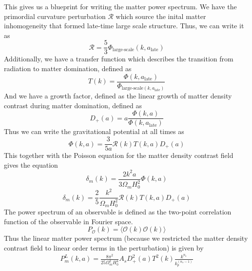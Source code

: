 This gives us a blueprint for writing the matter power spectrum. We have the primordial curvature perturbation $\mathcal{R}$ which source the inital matter inhomogeneity that formed late-time large scale structure. Thus, we can write it as
\begin{equation}
	\mathcal{R} = \frac{5}{3}\Phi_{\text{large-scale}}(k,a_{\text{late}})
\end{equation} 
Additionally, we have a transfer function which describes the transition from radiation to matter domination, defined as
\begin{equation}
	T(k) = \frac{\Phi(k,a_{\text{late}})}{\Phi_{\text{large-scale}(k,a_{\text{late}})}}
\end{equation}
And we have a growth factor, defined as the linear growth of matter density contrast during matter domination, defined as
\begin{equation}
	D_+(a) = a \frac{\Phi(k,a)}{\Phi(k,a_{\text{late}})}
\end{equation}
Thus we can write the gravitational potential at all times as
\begin{equation}
	\Phi(k,a) = \frac{3}{5a}\mathcal{R}(k)T(k,a)D_+(a)
\end{equation}
This together with the Poisson equation for the matter density contrast field gives the equation
\begin{equation}
	\delta_m(k) = \frac{2k^2a}{3\Omega_mH_0^2}\Phi(k,a)
\end{equation}
\begin{equation}
	\delta_m(k) = \frac{2}{5}\frac{k^2}{\Omega_mH_0^2}\mathcal{R}(k)T(k,a)D_+(a)
\end{equation}
The power spectrum of an observable is defined as the two-point correlation function of the observable in Fourier space.
\begin{equation}
	P_\mathcal{O}(k) = \langle \mathcal{O}(k)\mathcal{O}(k) \rangle
\end{equation}
Thus the linear matter power spectrum (because we restricted the matter density contrast field to linear order terms in the perturbation) is given by
\begin{equation}
	\begin{split}
		P_m^{L}(k,a) = \frac{8\pi^2}{25 \Omega_m^2 H_0^4} A_s D_+^2(a)T^2(k)\frac{k^{n_s}}{k_p^{(n_s-1)}}
	\end{split}
\end{equation}

